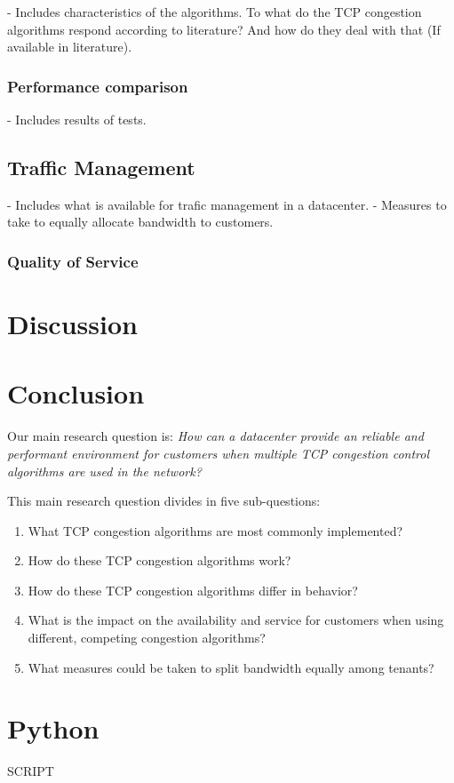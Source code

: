\documentclass{article}
\begin{document}
		- Includes characteristics of the algorithms. To what do the TCP congestion algorithms respond according to literature? And how do they deal with that (If available in literature).
		
		\subsubsection{Performance comparison}	
		- Includes results of tests.
	
	\subsection{Traffic Management}
	- Includes what is available for trafic management in a datacenter.
	- Measures to take to equally allocate bandwidth to customers.
		\subsubsection{Quality of Service}
			
		
		

\section{Discussion}


\section{Conclusion}


Our main research question is:
{\it How can a datacenter provide an reliable and performant environment for
customers when multiple TCP congestion control algorithms are used in the
network?}

\vspace{0.5cm}

This main research question divides in five sub-questions:

\begin{enumerate}
	\item What TCP congestion algorithms are most commonly implemented?
	\item How do these TCP congestion algorithms work?
	\item How do these TCP congestion algorithms differ in behavior?
	\item What is the impact on the availability and service for customers when using different, competing congestion algorithms?
	\item What measures could be taken to split bandwidth equally among tenants?
\end{enumerate}


\printbibliography

\appendix
\section{Python}
\label{appendix:python}
SCRIPT
\end{document}
